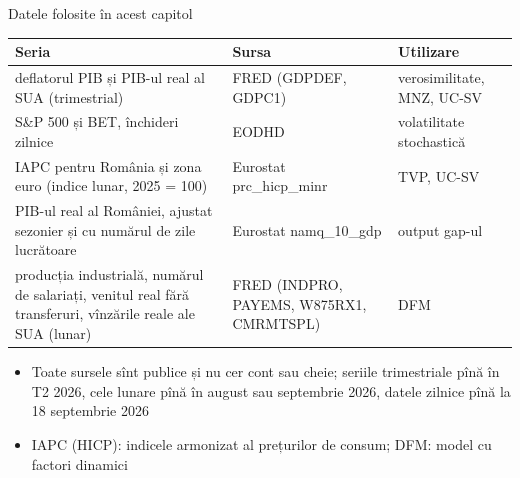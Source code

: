 \begin{frame}{Datele folosite în acest capitol}
\itemsize{\footnotesize}
\begin{center}
\scriptsize
\begin{tabular}{>{\raggedright\arraybackslash}p{5.0cm}>{\raggedright\arraybackslash}p{4.4cm}>{\raggedright\arraybackslash}p{2.5cm}}
\toprule
\textbf{Seria} & \textbf{Sursa} & \textbf{Utilizare} \\
\midrule
deflatorul PIB și PIB-ul real al SUA (trimestrial) & FRED (GDPDEF, GDPC1) & verosimilitate, MNZ, UC-SV \\
S\&P 500 și BET, închideri zilnice & EODHD & volatilitate stochastică \\
IAPC pentru România și zona euro (indice lunar, 2025 = 100) & Eurostat prc\_hicp\_minr & TVP, UC-SV \\
PIB-ul real al României, ajustat sezonier și cu numărul de zile lucrătoare & Eurostat namq\_10\_gdp & output gap-ul \\
producția industrială, numărul de salariați, venitul real fără transferuri, vînzările reale ale SUA (lunar) & FRED (INDPRO, PAYEMS, W875RX1, CMRMTSPL) & DFM \\
\bottomrule
\end{tabular}
\end{center}
\begin{itemize}
    \item Toate sursele sînt publice și nu cer cont sau cheie; seriile trimestriale pînă în T2 2026, cele lunare pînă în august sau septembrie 2026, datele zilnice pînă la 18 septembrie 2026
    \item IAPC (HICP): indicele armonizat al prețurilor de consum; DFM: model cu factori dinamici
\end{itemize}
\end{frame}

